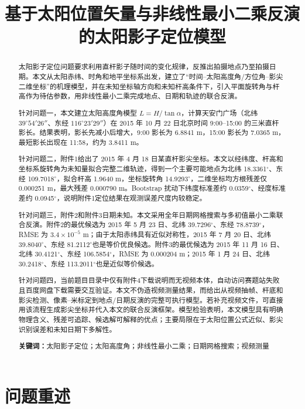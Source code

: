 \documentclass[UTF8,a4paper,12pt]{ctexart}
\title{基于太阳位置矢量与非线性最小二乘反演的太阳影子定位模型}
\author{}
\date{}
\begin{document}
\maketitle
\begin{abstract}
太阳影子定位问题要求利用直杆影子随时间的变化规律，反推出拍摄地点乃至拍摄日期。本文从太阳赤纬、时角和地平坐标系出发，建立了“时间--太阳高度角/方位角--影尖二维坐标”的机理模型，并在未知坐标轴方向和未知杆高条件下，引入平面旋转角与杆高作为待估参数，用非线性最小二乘完成地点、日期和轨迹的联合反演。

针对问题一，本文建立太阳高度角模型 $L=H/\tan\alpha$，计算天安门广场（北纬 $39^\circ54'26''$、东经 $116^\circ23'29''$）在 2015 年 10 月 22 日北京时间 9:00--15:00 的三米直杆影长。结果表明，影长先减小后增大，9:00 影长为 6.8841 m，15:00 影长为 7.0365 m，最短影长出现在 11:58，约为 3.8411 m。

针对问题二，附件1给出了 2015 年 4 月 18 日某直杆影尖坐标。本文以经纬度、杆高和坐标系旋转角为未知量拟合完整二维轨迹，得到一个主要可能地点为北纬 18.3361$^\circ$、东经 109.7018$^\circ$，拟合杆高 1.9640 m，坐标旋转角 14.9293$^\circ$，二维坐标均方根残差仅 0.000251 m，最大残差 0.000790 m。Bootstrap 扰动下纬度标准差约 0.0359$^\circ$、经度标准差约 0.0945$^\circ$，说明附件1定位结果在观测误差尺度内较稳定。

针对问题三，附件2和附件3日期未知。本文采用全年日期网格搜索与多初值最小二乘联合反演。附件2的最优候选为 2015 年 5 月 23 日、北纬 39.7296$^\circ$、东经 78.8739$^\circ$，RMSE 为 $3.4\times10^{-5}$ m；由于太阳赤纬具有近似对称性，2015 年 7 月 20 日、北纬 39.8040$^\circ$、东经 81.2112$^\circ$也是等价优良候选。附件3的最优候选为 2015 年 11 月 16 日、北纬 30.4121$^\circ$、东经 106.5854$^\circ$，RMSE 为 0.000204 m；2015 年 1 月 24 日、北纬 30.2418$^\circ$、东经 113.2011$^\circ$也是近似等价候选。

针对问题四，当前题目目录中仅有附件4下载说明而无视频本体，自动访问赛题站失败且百度网盘下载需要交互验证。本文不伪造视频测量结果，而给出从视频抽帧、杆底和影尖检测、像素--米标定到地点/日期反演的完整可执行模型。若补充视频文件，可直接用该流程生成影尖坐标并代入本文的联合反演框架。模型检验表明，本文模型具有明确物理含义、残差可追踪、候选解可解释的优点；主要局限在于太阳位置公式近似、影尖识别误差和未知日期下多解性。

\textbf{关键词：}太阳影子定位；太阳高度角；非线性最小二乘；日期网格搜索；视频测量
\end{abstract}
\newpage
\tableofcontents
\newpage

\section{问题重述}
\end{document}
